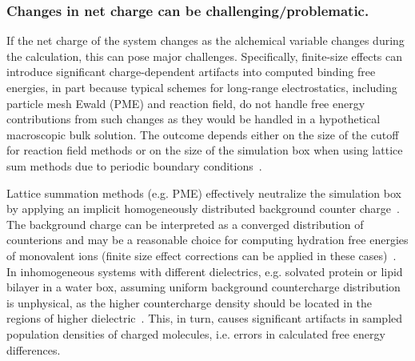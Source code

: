 \documentclass[9pt,bestpractices]{livecoms}
\begin{document}
\subsubsection{Changes in net charge can be challenging/problematic.}

If the net charge of the system changes as the alchemical variable changes during the calculation, this can pose major challenges.
Specifically, finite-size effects can introduce significant charge-dependent artifacts into computed binding free energies, in part because typical schemes for long-range electrostatics, including particle mesh Ewald (PME) and reaction field, do not handle free energy contributions from such changes as they would be handled in a hypothetical macroscopic bulk solution. The outcome depends either on the size of the cutoff for reaction field methods or on the size of the simulation box when using lattice sum methods due to periodic boundary conditions~\cite{lin2014overview, ohlknecht2020correcting, rocklin2013calculating}.

Lattice summation methods (e.g. PME) effectively neutralize the simulation box by applying an implicit homogeneously distributed background counter charge~\cite{figueirido1995finite,hummer1996free}. The background charge can be interpreted as a converged distribution of counterions and may be a reasonable choice for computing hydration free energies of monovalent ions (finite size effect corrections can be applied in these cases)~\cite{hummer1996free}. In inhomogeneous systems with different dielectrics, e.g. solvated protein or lipid bilayer in a water box, assuming uniform background countercharge distribution is unphysical, as the higher countercharge density should be located in the regions of higher dielectric~\cite{hub2014pme}. This, in turn, causes significant artifacts in sampled population densities of charged molecules, i.e. errors in calculated free energy differences.
\end{document}
